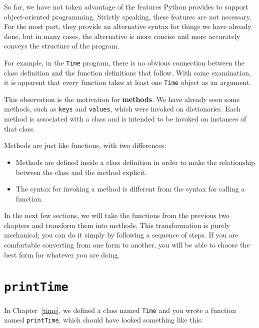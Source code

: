 So far, we have not taken advantage of the features Python provides to
support object-oriented programming.  Strictly speaking, these features are
not necessary.  For the most part, they provide an alternative syntax
for things we have already done, but in many cases, the
alternative is more concise and more accurately conveys the structure of
the program.

For example, in the {\tt Time} program, there is no obvious
connection between the class definition and the function definitions
that follow.  With some examination, it is apparent that every function
takes at least one {\tt Time} object as an argument.

This observation is the motivation for {\bf methods}.  We have already
seen some methods, such as {\tt keys} and {\tt values}, which were
invoked on dictionaries.  Each method is associated with a class and is
intended to be invoked on instances of that class.


Methods are just like functions, with
two differences:

\begin{itemize}

\item Methods are defined inside a class definition in order
to make the relationship between the class and the method explicit.

\item The syntax for invoking a method is different from the
syntax for calling a function.

\end{itemize}

In the next few sections, we will take the functions from the previous
two chapters and transform them into methods.  This transformation is
purely mechanical; you can do it simply by following a sequence of
steps.  If you are comfortable converting from one form to another,
you will be able to choose the best form for whatever you are doing.


\section{{\tt printTime}}
\label{printTime}

In Chapter~\ref{time}, we defined a class named
{\tt Time} and you wrote a function named {\tt printTime}, which
should have looked something like this:

